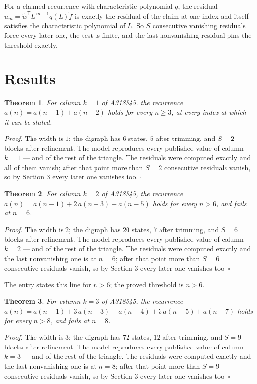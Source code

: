 \documentclass[11pt]{article}
\newtheorem{theorem}{Theorem}
\theoremstyle{definition}
\begin{document}
For a claimed recurrence with characteristic polynomial $q$, the residual $u_m = \tilde w^{\mathsf T}L^{\,m-1}q(L)\tilde f$ is exactly the residual of the claim at one index and itself satisfies the characteristic polynomial of $L$. So $S$ consecutive vanishing residuals force every later one, the test is finite, and the last nonvanishing residual pins the threshold exactly.

\section{Results}

\begin{theorem} For column $k = 1$ of A318545, the recurrence $a(n) = a(n-1) + a(n-2)$ holds for every $n \ge 3$, at every index at which it can be stated.\end{theorem}

{\itshape Proof.} The width is $1$; the digraph has $6$ states, $5$ after trimming, and $S = 2$ blocks after refinement. The model reproduces every published value of column $k = 1$ --- and of the rest of the triangle. The residuals were computed exactly and all of them vanish; after that point more than $S = 2$ consecutive residuals vanish, so by Section 3 every later one vanishes too. $\square$

\begin{theorem} For column $k = 2$ of A318545, the recurrence $a(n) = a(n-1) + 2\,a(n-3) + a(n-5)$ holds for every $n > 6$, and fails at $n = 6$.\end{theorem}

{\itshape Proof.} The width is $2$; the digraph has $20$ states, $7$ after trimming, and $S = 6$ blocks after refinement. The model reproduces every published value of column $k = 2$ --- and of the rest of the triangle. The residuals were computed exactly and the last nonvanishing one is at $n = 6$; after that point more than $S = 6$ consecutive residuals vanish, so by Section 3 every later one vanishes too. $\square$

The entry states this line for $n > 6$; the proved threshold is $n > 6$.

\begin{theorem} For column $k = 3$ of A318545, the recurrence $a(n) = a(n-1) + 3\,a(n-3) + a(n-4) + 3\,a(n-5) + a(n-7)$ holds for every $n > 8$, and fails at $n = 8$.\end{theorem}

{\itshape Proof.} The width is $3$; the digraph has $72$ states, $12$ after trimming, and $S = 9$ blocks after refinement. The model reproduces every published value of column $k = 3$ --- and of the rest of the triangle. The residuals were computed exactly and the last nonvanishing one is at $n = 8$; after that point more than $S = 9$ consecutive residuals vanish, so by Section 3 every later one vanishes too. $\square$
\end{document}
